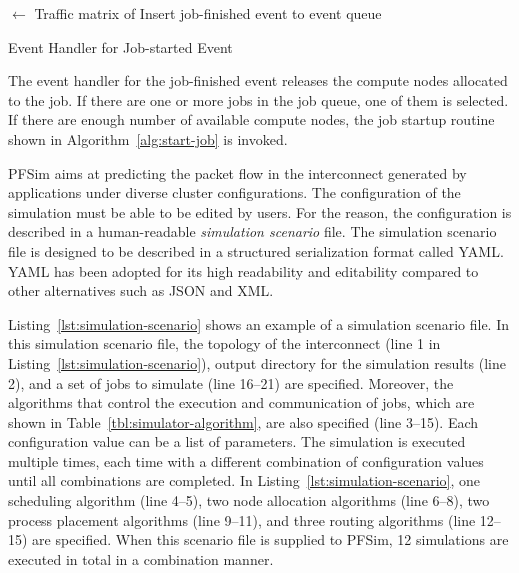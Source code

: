 \begin{algorithm}

    \TrafficMatrix $\gets$ Traffic matrix of \Job\;
    Insert job-finished event to event queue\;

    \caption{Event Handler for Job-started Event}%
    \label{alg:on-job-started}
\end{algorithm}

The event handler for the job-finished event releases the compute nodes
allocated to the job. If there are one or more jobs in the job queue, one of
them is selected. If there are enough number of available compute nodes, the
job startup routine shown in Algorithm~\ref{alg:start-job} is invoked.

PFSim aims at predicting the packet flow in the interconnect generated by
applications under diverse cluster configurations. The configuration of the
simulation must be able to be edited by users. For the reason, the
configuration is described in a human-readable \emph{simulation scenario}
file. The simulation scenario file is designed to be described in a structured
serialization format called YAML\@. YAML has been adopted for its high
readability and editability compared to other alternatives such as JSON and
XML\@.

Listing~\ref{lst:simulation-scenario} shows an example of a simulation
scenario file. In this simulation scenario file, the topology of the
interconnect (line 1 in Listing~\ref{lst:simulation-scenario}), output
directory for the simulation results (line 2), and a set of jobs to simulate
(line 16--21) are specified. Moreover, the algorithms that control the
execution and communication of jobs, which are shown in
Table~\ref{tbl:simulator-algorithm}, are also specified (line 3--15). Each
configuration value can be a list of parameters. The simulation is executed
multiple times, each time with a different combination of configuration values
until all combinations are completed. In
Listing~\ref{lst:simulation-scenario}, one scheduling algorithm (line 4--5),
two node allocation algorithms (line 6--8), two process placement algorithms
(line 9--11), and three routing algorithms (line 12--15) are specified. When
this scenario file is supplied to PFSim, 12 simulations are executed in total
in a combination manner.

